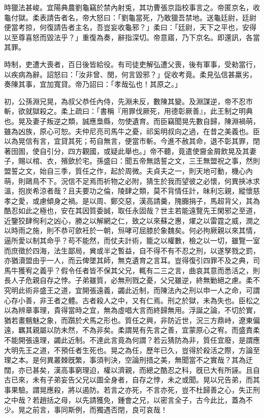 \begin{pinyinscope}
時獵法甚峻。宜陽典農劉龜竊於禁內射兎，其功曹張京詣校事言之。帝匿京名，收龜付獄。柔表請告者名，帝大怒曰：「劉龜當死，乃敢獵吾禁地。送龜廷尉，廷尉便當考掠，何復請告者主名，吾豈妄收龜邪？」柔曰：「廷尉，天下之平也，安得以至尊喜怒而毀法乎？」重復為奏，辭指深切。帝意寤，乃下京名。即還訊，各當其罪。

時制，吏遭大喪者，百日後皆給役。有司徒吏解弘遭父喪，後有軍事，受勑當行，以疾病為辭。詔怒曰：「汝非曾、閔，何言毀邪？」促收考竟。柔見弘信甚羸劣，奏陳其事，宜加寬貸。帝乃詔曰：「孝哉弘也！其原之。」

初，公孫淵兄晃，為叔父恭任內侍，先淵未反，數陳其變。及淵謀逆，帝不忍巿斬，欲就獄殺之。柔上疏曰：「書稱『用罪伐厥死，用德彰厥善』，此王制之明典也。晃及妻子叛逆之類，誠應梟縣，勿使遺育。而臣竊聞晃先數自歸，陳淵禍萌，雖為凶族，原心可恕。夫仲尼亮司馬牛之憂，祁奚明叔向之過，在昔之美義也。臣以為晃信有言，宜貸其死；苟自無言，便當巿斬。今進不赦其命，退不彰其罪，閉著囹圄，使自引分，四方觀國，或疑此舉也。」帝不聽，竟遣使齎金屑飲晃及其妻子，賜以棺、衣，殯歛於宅。孫盛曰：聞五帝無誥誓之文，三王無盟祝之事，然則盟誓之文，始自三季，質任之作，起於周微。夫貞夫之一，則天地可動，機心內萌，則鷗鳥不下。況信不足焉而祈物之必附，猜生於我而望彼之必懷，何異挾冰求溫，抱炭希涼者哉？且夫要功之倫，陵肆之類，莫不背情任計，昧利忘親，縱懷慈孝之愛，或慮傾身之禍。是以周、鄭交惡，漢高請羹，隗嚻捐子，馬超背父，其為酷忍如此之極也，安在其因質委誠，取任永固哉？世主若能遠覽先王閑邪之至道，近鑒狡肆徇利之凶心，勝之以解網之仁，致之以來蘇之惠，燿之以雷霆之威，潤之以時雨之施，則不恭可歛衽於一朝，炰哮可屈膝於象魏矣。何必拘厥親以來其情，逼所愛以制其命乎？苟不能然，而仗夫計術，籠之以權數，檢之以一切，雖覽一室而庶徵於四海，法生鄙局，兾或半之暫益，自不得不有不忍之刑，以遂孥戮之罰，亦猶瀆盟由乎一人，而云俾墜其師，無克遺育之言耳。豈得復引四罪不及之典，司馬牛獲宥之義乎？假令任者皆不保其父兄，輒有二三之言，曲哀其意而悉活之，則長人子危親自存之悖。子弟雖質，必無刑戮之憂，父兄雖逆，終無勦絕之慮。柔不究明此術非盛王之道，宜開張遠義，蠲此近制，而陳法內之刑以申一人之命，可謂心存小善，非王者之體。古者殺人之中，又有仁焉。刑之於獄，未為失也。臣松之以為辨章事理，貴得當時之宜，無為虛唱大言而終歸無用。浮誕之論，不切於實，猶若畫魑魅之象，而躓於犬馬之形也。質任之興，非防近世，況三方鼎峙，遼東偏遠，羈其親屬以防未然，不為非矣。柔謂晃有先言之善，宜蒙原心之宥。而盛責柔不能開張遠理，蠲此近制。不達此言竟為何謂？若云猜防為非，質任宜廢，是謂應大明先王之道，不預任者生死也。晃之為任，歷年已久，豈得於殺活之際，方論至理之本。是何異叢棘旣繁，事須判決，空論刑措之美，無聞當不之實哉？其為迂闊，亦已甚矣，漢高事窮理迫，權以濟親，而總之酷忍之科，旣已大有所誣。且自古已來，未有子弟妄告父兄以圖全身者，自存之悖，未之或聞。晃以兄告弟，而其事果驗。謂晃應殺，將以遏防。若言之亦死，不言亦死，豈不杜歸善之心，失正刑之中哉？若趙括之母，以先請獲免，鍾會之兄，以密言全子，古今此比，蓋為不少。晃之前言，事同斯例，而獨遇否閉，良可哀哉！


\end{pinyinscope}
